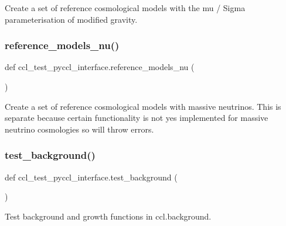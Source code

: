 \begin{DoxyVerb}Create a set of reference cosmological models with the mu / Sigma
parameterisation of modified gravity. \end{DoxyVerb}
 \mbox{\label{namespaceccl__test__pyccl__interface_a2d1bcf258dbc29d3e39ce74e3dff711e}} 
\subsubsection{\texorpdfstring{reference\+\_\+models\+\_\+nu()}{reference\_models\_nu()}}
{\footnotesize\ttfamily def ccl\+\_\+test\+\_\+pyccl\+\_\+interface.\+reference\+\_\+models\+\_\+nu (\begin{DoxyParamCaption}{ }\end{DoxyParamCaption})}

\begin{DoxyVerb}Create a set of reference cosmological models with massive neutrinos.
This is separate because certain functionality is not yes implemented
for massive neutrino cosmologies so will throw errors.
\end{DoxyVerb}
 \mbox{\label{namespaceccl__test__pyccl__interface_ac8e0f5304f7823f08dd48bd16736cbde}} 
\subsubsection{\texorpdfstring{test\+\_\+background()}{test\_background()}}
{\footnotesize\ttfamily def ccl\+\_\+test\+\_\+pyccl\+\_\+interface.\+test\+\_\+background (\begin{DoxyParamCaption}{ }\end{DoxyParamCaption})}

\begin{DoxyVerb}Test background and growth functions in ccl.background.
\end{DoxyVerb}
 \mbox{\label{namespaceccl__test__pyccl__interface_af43480922699de3f04ac202305e22666}} 
